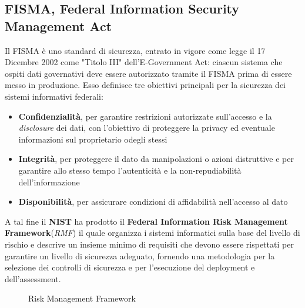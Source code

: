 \documentclass[../main.tex]{subfiles}
\begin{document}
\subsection{FISMA, Federal Information Security Management Act}
Il FISMA è uno standard di sicurezza, entrato in vigore come legge il 17 Dicembre 2002 come "Titolo III" dell'E-Government Act\cite{united2004information}: ciascun sistema che ospiti dati governativi deve essere autorizzato tramite il FISMA prima di essere messo in produzione.
Esso definisce tre obiettivi principali per la sicurezza dei sistemi informativi federali:
\begin{itemize}
    \item \textbf{Confidenzialità}, per garantire restrizioni autorizzate sull'accesso e la \textit{disclosure} dei dati, con l'obiettivo di proteggere la privacy ed eventuale informazioni sul proprietario odegli stessi
    \item \textbf{Integrità}, per proteggere il dato da manipolazioni o azioni distruttive e per garantire allo stesso tempo l'autenticità e la non-repudiabilità dell'informazione
    \item \textbf{Disponibilità}, per assicurare condizioni di affidabilità nell'accesso al dato
\end{itemize}

A tal fine il \textbf{NIST} ha prodotto il \textbf{Federal Information Risk Management Framework}(\textit{RMF}) il quale organizza i sistemi informatici sulla base del livello di rischio e descrive un insieme minimo di requisiti che devono essere rispettati per garantire un livello di sicurezza adeguato\cite{nist2003nist}, fornendo una metodologia per la selezione dei controlli di sicurezza e per l'esecuzione del deployment e dell'assessment.

\begin{figure}[H]
\centering
{}
\caption{Risk Management Framework \cite{nist2003nist} }\label{fig:riskmanagementfw}
\end{figure}
\end{document}
